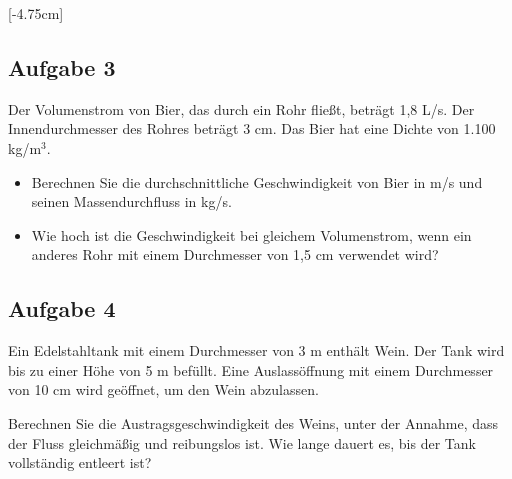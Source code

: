 \documentclass[a4paper,11pt]{article}
\newif\ifshowme
\begin{document}
[-4.75cm]





\subsection*{Aufgabe 3}
Der Volumenstrom von Bier, das durch ein Rohr fließt, beträgt 1,8 L/s. Der
Innendurchmesser des Rohres beträgt 3 cm. Das Bier hat eine Dichte von 1.100 kg/m$^3$.

\begin{itemize}
\item Berechnen Sie die durchschnittliche Geschwindigkeit von Bier in m/s und seinen Massendurchfluss in kg/s.
\item Wie hoch ist die Geschwindigkeit bei gleichem Volumenstrom, wenn ein anderes Rohr mit einem Durchmesser von 1,5 cm verwendet wird?
\end{itemize}

\ifshowme
\antwort{
$\dot{V} = 1,8 ~$L$/$s $ = 0,0018~$m$^3/$s \par 
$r=0,015~$m \pp
Massendurchfluss:
\begin{align*}
0,0018~\m^3/\s \cdot 1100~\kg/\m^3 = 1,98~\kg/\s
\end{align*}
Mittlere Geschwindigkeiten für versch. Durchmesser:
\begin{align*}
\overline{v} = \frac{\dot{V}}{A} \rightarrow \qquad \overline{v} &= \frac{0,0018~\m^3/s}{\pi \cdot (0,015~\text{m})^2} \qquad = 2,546~\m/\s \\
\overline{v} &= \frac{0,0018~\m^3/\s}{\pi \cdot (0,0075~\text{m})^2} \qquad = 10,19~\m/\s \\
\end{align*}
}
\pagebreak
\else
\fi




\subsection*{Aufgabe 4}
Ein Edelstahltank mit einem Durchmesser von 3 m enthält Wein. Der Tank wird bis zu
einer Höhe von 5 m befüllt. Eine Auslassöffnung mit einem Durchmesser von 10 cm wird
geöffnet, um den Wein abzulassen. \par Berechnen Sie die Austragsgeschwindigkeit des
Weins, unter der Annahme, dass der Fluss gleichmäßig und reibungslos ist. Wie lange
dauert es, bis der Tank vollständig entleert ist?
\end{document}
